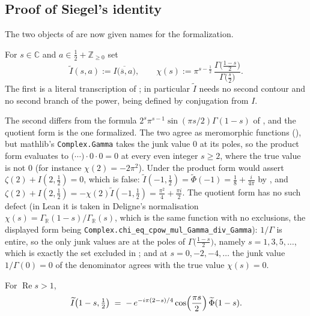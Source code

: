 \subsection{Proof of Siegel's identity}
\label{sec:rsz_proof}

The two objects of  are now given names for the formalization.

\begin{definition}
\label{def:rsz_mirror}
\leanok
{}
For $s\in\mathbb{C}$ and $a\in\tfrac12+\mathbb{Z}_{\ge0}$ set
\[
  \widetilde I(s,a):=\overline{I\bigl(\overline{s},a\bigr)},
  \qquad
  \chi(s):=\pi^{s-\frac12}\,
     \frac{\Gamma\bigl(\frac{1-s}2\bigr)}{\Gamma\bigl(\frac s2\bigr)} .
\]
The first is a literal transcription of ; in particular $\widetilde I$
needs no second contour and no second branch of the power, being defined by conjugation from
$I$.

The second differs from the formula $2^{s}\pi^{s-1}\sin(\pi s/2)\Gamma(1-s)$ of
, and the quotient form is the one formalized.  The two agree as
meromorphic functions
(), but mathlib's \texttt{Complex.Gamma} takes the junk value $0$ at its
poles, so the product form evaluates to $\bigl(\cdots\bigr)\cdot0\cdot0=0$ at every even
integer $s\ge2$, where the true value is not $0$ (for instance $\chi(2)=-2\pi^{2}$).  Under
the product form  would assert $\zeta(2)+I(2,\tfrac12)=0$, which is
false: $\widetilde I(-1,\tfrac12)=\widetilde\Phi(-1)=\tfrac18+\tfrac i{4\pi}$ by
, and $\zeta(2)+I(2,\tfrac12)=-\chi(2)\widetilde I(-1,\tfrac12)
=\tfrac{\pi^{2}}4+\tfrac{\pi i}2$.  The quotient form has no such defect (in Lean it is taken in Deligne's normalisation
$\chi(s)=\Gamma_{\mathbb{R}}(1-s)/\Gamma_{\mathbb{R}}(s)$, which is the same function with no
exclusions, the displayed form being \texttt{Complex.chi\_eq\_cpow\_mul\_Gamma\_div\_Gamma}):
$1/\Gamma$ is entire, so the only junk values are at the
poles of $\Gamma\bigl(\frac{1-s}2\bigr)$, namely $s=1,3,5,\dots$, which is exactly the set
excluded in ; and at $s=0,-2,-4,\dots$ the junk value $1/\Gamma(0)=0$
of the denominator agrees with the true value $\chi(s)=0$.
\end{definition}

\begin{lemma}
\label{lem:rsz_mirror}
\leanok
{}
For $\operatorname{Re}s>1$,
\[
  \widetilde I\bigl(1-s,\tfrac12\bigr)
   \;=\;-\,e^{-i\pi(2-s)/4}\cos\Bigl(\frac{\pi s}{2}\Bigr)\,\widetilde\Phi(1-s).
\]
\end{lemma}

